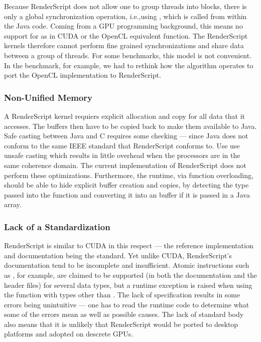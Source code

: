 Because RenderScript does not allow one to group threads into blocks, there is
only a global synchronization operation, i.e.,using ,  which is
called from within the Java code.  Coming from a GPU programming background,
this means no support for  as in CUDA or the OpenCL
equivalent  function.  The RenderScript kernels therefore cannot
perform fine grained synchronizations and share data between a group of threads.
For some benchmarks, this model is not convenient.  In the 
benchmark, for example, we had to rethink how the algorithm operates to port the
OpenCL implementation to RenderScript.


\subsubsection{Non-Unified Memory}

A RenderScript kernel requiers explicit allocation and copy for all data that it accesses. The buffers then have to be copied back to
make them available to Java.  Safe casting between Java and C requires some
checking --- since Java does not conform to the same IEEE standard that
RenderScript conforms to.  Use use unsafe casting which results in little overhead when the processors are in the same coherence domain.  The current
implementation of RenderScript does not perform these optimizations.
Furthermore, the runtime, via function overloading, should be able to hide
explicit buffer creation and copies, by detecting the type passed into the
function and converting it into an  buffer if it is passed in a Java
array.

\subsubsection{Lack of a Standardization}

RenderScript is similar to CUDA in this respect --- the reference implementation
  and documentation being the standard.
Yet unlike CUDA, RenderScript's documentation tend to be incomplete and insufficient.
Atomic instructions such as , for example, are claimed to be supported
(in both the documentation and the header files) for several data types, but a 
runtime exception is raised when using the function with types other than .
The lack of specification results in some errors being unintuitive --- one has to 
  read the runtime code to determine what some of the errors mean as well as possible causes.
The lack of standard body also means that it is unlikely that RenderScript would be 
  ported to desktop platforms and adopted on descrete GPUs.


